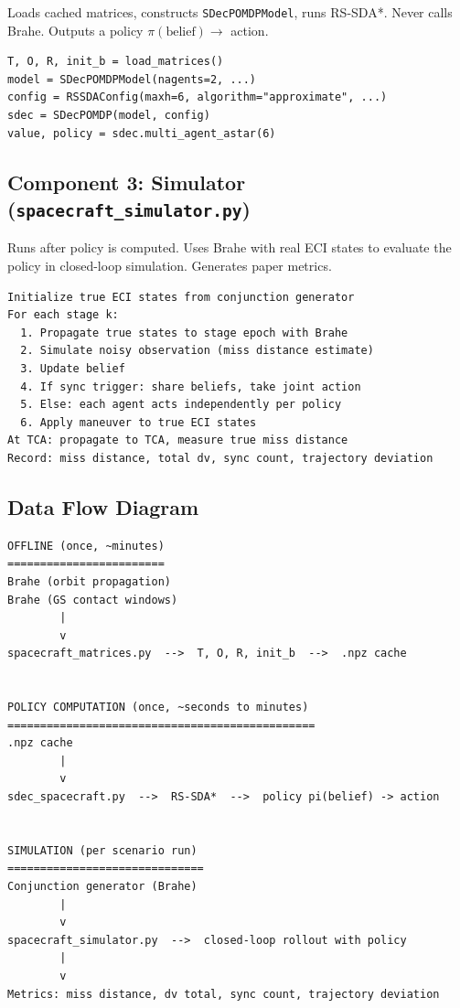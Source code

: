 \documentclass[11pt]{article}
\begin{document}
Loads cached matrices, constructs \texttt{SDecPOMDPModel}, runs RS-SDA*.
Never calls Brahe. Outputs a policy $\pi(\text{belief}) \rightarrow$ action.

\begin{verbatim}
T, O, R, init_b = load_matrices()
model = SDecPOMDPModel(nagents=2, ...)
config = RSSDAConfig(maxh=6, algorithm="approximate", ...)
sdec = SDecPOMDP(model, config)
value, policy = sdec.multi_agent_astar(6)
\end{verbatim}

\subsection{Component 3: Simulator (\texttt{spacecraft\_simulator.py})}

Runs after policy is computed. Uses Brahe with real ECI states to evaluate
the policy in closed-loop simulation. Generates paper metrics.

\begin{verbatim}
Initialize true ECI states from conjunction generator
For each stage k:
  1. Propagate true states to stage epoch with Brahe
  2. Simulate noisy observation (miss distance estimate)
  3. Update belief
  4. If sync trigger: share beliefs, take joint action
  5. Else: each agent acts independently per policy
  6. Apply maneuver to true ECI states
At TCA: propagate to TCA, measure true miss distance
Record: miss distance, total dv, sync count, trajectory deviation
\end{verbatim}

\subsection{Data Flow Diagram}

\begin{verbatim}
OFFLINE (once, ~minutes)
========================
Brahe (orbit propagation)
Brahe (GS contact windows)
        |
        v
spacecraft_matrices.py  -->  T, O, R, init_b  -->  .npz cache


POLICY COMPUTATION (once, ~seconds to minutes)
===============================================
.npz cache
        |
        v
sdec_spacecraft.py  -->  RS-SDA*  -->  policy pi(belief) -> action


SIMULATION (per scenario run)
==============================
Conjunction generator (Brahe)
        |
        v
spacecraft_simulator.py  -->  closed-loop rollout with policy
        |
        v
Metrics: miss distance, dv total, sync count, trajectory deviation
\end{verbatim}
\end{document}
